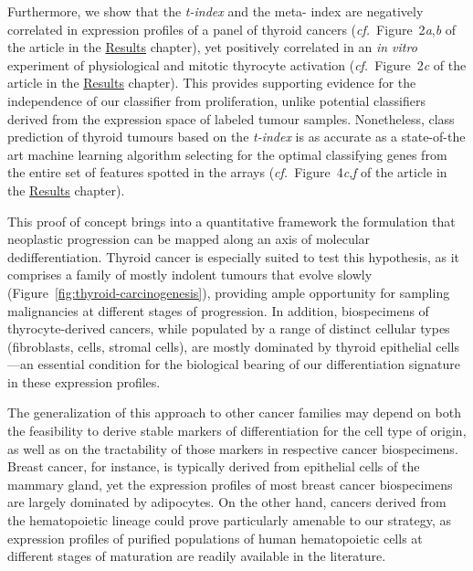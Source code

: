 Furthermore, we show that the \emph{t-index} and the meta- index
are negatively correlated in expression profiles of a panel of thyroid cancers
(\mbox{\emph{cf.} Figure~2\emph{a},\emph{b}} of the article in the
\hyperref[chap:results]{\textsf{Results}} chapter), yet positively correlated in
an \emph{in vitro} experiment of physiological and mitotic thyrocyte activation
(\mbox{\emph{cf.} Figure~2\emph{c}} of the article in the
\hyperref[chap:results]{\textsf{Results}} chapter).  This provides supporting
evidence for the independence of our classifier from proliferation, unlike
potential classifiers derived from the expression space of labeled tumour
samples.  Nonetheless, class prediction of thyroid tumours based on the
\emph{t-index} is as accurate as a state-of-the art machine learning algorithm
selecting for the optimal classifying genes from the entire set of features
spotted in the arrays (\mbox{\emph{cf.} Figure~4\emph{c},\emph{f}} of the
article in the \hyperref[chap:results]{\textsf{Results}} chapter).

This proof of concept brings into a quantitative framework the formulation that
neoplastic progression can be mapped along an axis of molecular
dedifferentiation.  Thyroid cancer is especially suited to test this hypothesis,
as it comprises a family of mostly indolent tumours that evolve slowly
(Figure~\ref{fig:thyroid-carcinogenesis}), providing ample opportunity for
sampling malignancies at different stages of progression.  In addition,
biospecimens of thyrocyte-derived cancers, while populated by a range of
distinct cellular types (fibroblasts,  cells, stromal cells), are
mostly dominated by thyroid epithelial cells---an essential condition for the
biological bearing of our differentiation signature in these expression
profiles.

The generalization of this approach to other cancer families may depend on both
the feasibility to derive stable markers of differentiation for the cell type of
origin, as well as on the tractability of those markers in respective cancer
biospecimens.  Breast cancer, for instance, is typically derived from epithelial
cells of the mammary gland, yet the expression profiles of most breast cancer
biospecimens are largely dominated by adipocytes.  On the other hand, cancers
derived from the hematopoietic lineage could prove particularly amenable to our
strategy, as expression profiles of purified populations of human hematopoietic
cells at different stages of maturation are readily available in the
literature.\cite{novershtern_densely_2011}

